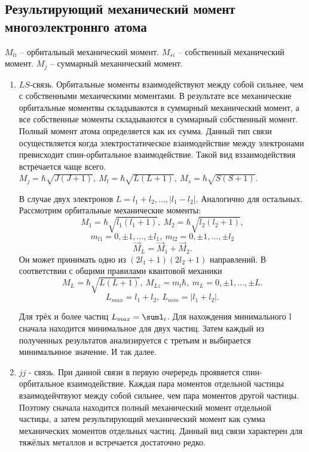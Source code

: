 \subsection{Результирующий механический момент многоэлектроннго атома}
\( M_{li} \) -- орбитальный механический момент.
\( M_{si} \) -- собственный механический момент.
\( M_{j} \) -- суммарный механический момент.

\begin{enumerate}
    \item \( LS \)-связь. Орбитальные моменты взаимодействуют между собой сильнее, чем с собственными мехаическими моментами. В результате все механические орбитальные моментвы складываются в суммарный механический момент, а все собственные моменты складываются в суммарный собственный момент. Полный момент атома определяется как их сумма. Данный тип связи осуществляется когда электростатическое взаимодействие между электронами превисходит спин-орбитальное взаимодействие. Такой вид вззаимодействия встречается чаще всего. \( M_j = \hbar\sqrt{J(J+1)},\ M_l = \hbar\sqrt{L(L+1)},\ M_s = \hbar\sqrt{S(S+1)} \).

    В случае двух электронов \( L = l_1+l_2, \ldots, |l_1-l_2| \). Аналогично для остальных.
    Рассмотрим орбитальные механические моменты:
    \[
        M_1 = \hbar\sqrt{l_1(l_1+1)},\ M_2 = \hbar\sqrt{l_2(l_2+1)},
    \]
    \[
        m_{l1} = 0, \pm1, \ldots, \pm l_1,\ m_{l2} = 0, \pm1, \ldots, \pm l_2
    \]
    \[
        \vec{M}_L = \vec{M}_1 + \vec{M}_2.
    \]
    Он может принимать одно из \( (2l_1 + 1)(2l_2 + 1) \) направлений. В соответствии с общими правилами квантовой механики
    \[
        M_L = \hbar\sqrt{L(L+1)},\ M_{Lz} = m_l\hbar,\ m_L = 0, \pm1, \ldots, \pm L.
    \]
    \[
        L_{max} = l_1 + l_2,\ L_{min} = |l_1 + l_2|.
    \]

    Для трёх и более частиц \( L_{max} = \suml_i \). Для нахождения минимального l сначала находится минимальное для двух частиц. Затем каждый из полученных результатов анализируется с третьим и выбирается минимальнное значение. И так далее.
    \item \( jj \) - связь. При данной связи в первую очерередь проявяется спин-орбитальное взаимодействие. Каждая пара моментов отдельной частицы взаимодейчтвуют между собой сильнее, чем пара моментов другой частицы. Поэтому сначала находится полный механический момент отдельной частицы, а затем результирующий механический момент как сумма механических моментов отдельных частиц. Данный вид связи характерен для тяжёлых металлов и встречается достаточно редко.
\end{enumerate}

